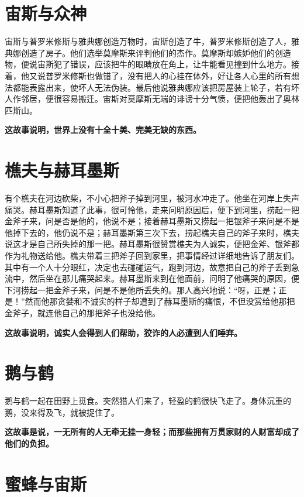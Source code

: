 \section{宙斯与众神}

宙斯与普罗米修斯与雅典娜创造万物时，宙斯创造了牛，普罗米修斯创造了人，雅典娜创造了房子。他们选举莫摩斯来评判他们的杰作。莫摩斯却嫉妒他们的创造物，便说宙斯犯了错误，应该把牛的眼睛放在角上，让牛能看见撞到什么地方。接着，他又说普罗米修斯也做错了，没有把人的心挂在体外，好让各人心里的所有想法都能表露出来，使坏人无法伪装。最后他说雅典娜应该把房屋装上轮子，若有坏人作邻居，便很容易搬迁。宙斯对莫摩斯无端的诽谤十分气愤，便把他轰出了奥林匹斯山。

{\bfseries \color{red}这故事说明，世界上没有十全十美、完美无缺的东西。}

\section{樵夫与赫耳墨斯}

有个樵夫在河边砍柴，不小心把斧子掉到河里，被河水冲走了。他坐在河岸上失声痛哭。赫耳墨斯知道了此事，很可怜他，走来问明原因后，便下到河里，捞起一把金斧子来，问是否是他的，他说不是；接着赫耳墨斯又捞起一把银斧子来问是不是他掉下去的，他仍说不是；赫耳墨斯第三次下去，捞起樵夫自己的斧子来时，樵夫说这才是自己所失掉的那一把。赫耳墨斯很赞赏樵夫为人诚实，便把金斧、银斧都作为礼物送给他。樵夫带着三把斧子回到家里，把事情经过详细地告诉了朋友们。其中有一个人十分眼红，决定也去碰碰运气，跑到河边，故意把自己的斧子丢到急流中，然后坐在那儿痛哭起来。赫耳墨斯来到在他面前，问明了他痛哭的原因，便下河捞起一把金斧子来，问是不是他所丢失的。那人高兴地说：“呀，正是；正是！”然而他那贪婪和不诚实的样子却遭到了赫耳墨斯的痛恨，不但没赏给他那把金斧子，就连他自己的那把斧子也没给他。

{\bfseries \color{red}这故事说明，诚实人会得到人们帮助，狡诈的人必遭到人们唾弃。}

\section{鹅与鹤}

鹅与鹤一起在田野上觅食。突然猎人们来了，轻盈的鹤很快飞走了。身体沉重的鹅，没来得及飞，就被捉住了。

{\bfseries \color{red}这故事是说，一无所有的人无牵无挂一身轻；而那些拥有万贯家财的人财富却成了他们的负担。}

\section{蜜蜂与宙斯}

